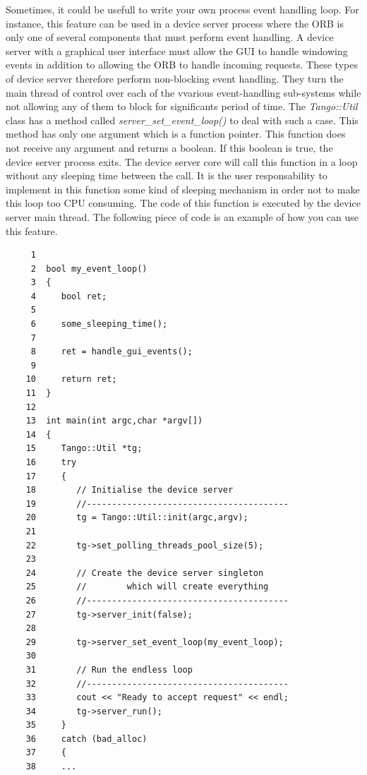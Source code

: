 Sometimes, it could be usefull to write your own process event handling
loop. For instance, this feature can be used in
a device server process where the ORB is only one of several components
that must perform event handling. A device server with a graphical
user interface must allow the GUI to handle windowing events in addition
to allowing the ORB to handle incoming requests. These types of device
server therefore perform non-blocking event handling. They turn the
main thread of control over each of the vvarious event-handling sub-systems
while not allowing any of them to block for significants period of
time. The \emph{Tango::Util} class has a method called \emph{server\_set\_event\_loop()}
to deal with such a case. This method has only one argument which
is a function pointer. This function does not receive any argument
and returns a boolean. If this boolean is true, the device server
process exits. The device server core will call this function in a
loop without any sleeping time between the call. It is the user responsability
to implement in this function some kind of sleeping mechanism in order
not to make this loop too CPU consuming. The code of this function
is executed by the device server main thread. The following
piece of code is an example of how you can use this feature.


\begin{verbatim}
     1  
     2  bool my_event_loop()
     3  {
     4     bool ret;
     5  
     6     some_sleeping_time();
     7  
     8     ret = handle_gui_events();
     9  
    10     return ret;
    11  }
    12  
    13  int main(int argc,char *argv[])
    14  {
    15     Tango::Util *tg;
    16     try
    17     {
    18        // Initialise the device server
    19        //----------------------------------------
    20        tg = Tango::Util::init(argc,argv);
    21  
    22        tg->set_polling_threads_pool_size(5);
    23  
    24        // Create the device server singleton 
    25        //        which will create everything
    26        //----------------------------------------
    27        tg->server_init(false);
    28  
    29        tg->server_set_event_loop(my_event_loop);
    30  
    31        // Run the endless loop
    32        //----------------------------------------
    33        cout << "Ready to accept request" << endl;
    34        tg->server_run();
    35     }
    36     catch (bad_alloc)
    37     {
    38     ...
\end{verbatim}


